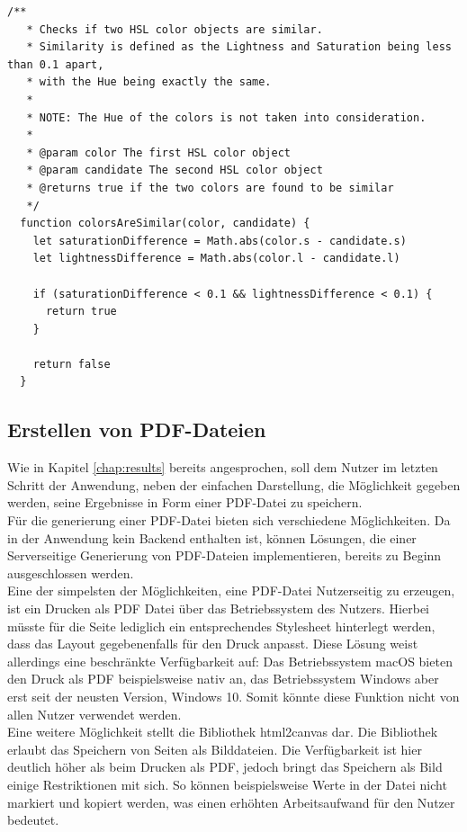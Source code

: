 \begin{lstlisting}[caption=Überprüfen der Ähnlichkeit zweier Farben, label=lst:similar]
  /**
   * Checks if two HSL color objects are similar.
   * Similarity is defined as the Lightness and Saturation being less than 0.1 apart,
   * with the Hue being exactly the same.
   *
   * NOTE: The Hue of the colors is not taken into consideration.
   *
   * @param color The first HSL color object
   * @param candidate The second HSL color object
   * @returns true if the two colors are found to be similar
   */
  function colorsAreSimilar(color, candidate) {
    let saturationDifference = Math.abs(color.s - candidate.s)
    let lightnessDifference = Math.abs(color.l - candidate.l)

    if (saturationDifference < 0.1 && lightnessDifference < 0.1) {
      return true
    }

    return false
  }
\end{lstlisting}


\subsection{Erstellen von PDF-Dateien}
\label{chap:pdf}
Wie in Kapitel \ref{chap:results} bereits angesprochen, soll dem Nutzer im letzten Schritt der Anwendung, neben der einfachen Darstellung, die Möglichkeit gegeben werden, seine Ergebnisse in Form einer PDF-Datei zu speichern.\\
Für die generierung einer PDF-Datei bieten sich verschiedene Möglichkeiten. Da in der Anwendung kein Backend enthalten ist, können Lösungen, die einer Serverseitige Generierung von PDF-Dateien implementieren, bereits zu Beginn ausgeschlossen werden.\\

Eine der simpelsten der Möglichkeiten, eine PDF-Datei Nutzerseitig zu erzeugen, ist ein Drucken als PDF Datei über das Betriebssystem des Nutzers. Hierbei müsste für die Seite lediglich ein entsprechendes Stylesheet hinterlegt werden, dass das Layout gegebenenfalls für den Druck anpasst. Diese Lösung weist allerdings eine beschränkte Verfügbarkeit auf: Das Betriebssystem macOS bieten den Druck als PDF beispielsweise nativ an, das Betriebssystem Windows aber erst seit der neusten Version, Windows 10. Somit könnte diese Funktion nicht von allen Nutzer verwendet werden.\\

Eine weitere Möglichkeit stellt die Bibliothek html2canvas\footnotemark{} dar. Die Bibliothek erlaubt das Speichern von Seiten als Bilddateien. Die Verfügbarkeit ist hier deutlich höher als beim Drucken als PDF, jedoch bringt das Speichern als Bild einige Restriktionen mit sich. So können beispielsweise Werte in der Datei nicht markiert und kopiert werden, was einen erhöhten Arbeitsaufwand für den Nutzer bedeutet.

